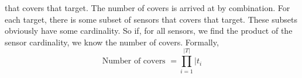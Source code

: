 


 that covers that target. The number of covers is arrived at by combination. For each target, there is some subset of sensors that covers that target. These subsets obviously have some cardinality. So if, for all sensors, we find the product of the sensor cardinality, we know the number of covers. Formally, \begin{equation}
\text{Number of covers } = \prod_{i = 1}^{|T|} |t_i
\end{equation}


